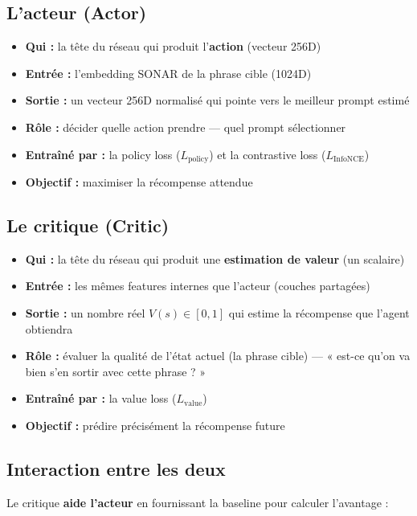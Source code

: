 \documentclass[11pt,a4paper]{article}
\begin{document}
\subsection{L'acteur (Actor)}

\begin{itemize}
    \item \textbf{Qui :} la tête du réseau qui produit l'\textbf{action} (vecteur 256D)
    \item \textbf{Entrée :} l'embedding SONAR de la phrase cible (1024D)
    \item \textbf{Sortie :} un vecteur 256D normalisé qui pointe vers le meilleur prompt estimé
    \item \textbf{Rôle :} décider quelle action prendre — quel prompt sélectionner
    \item \textbf{Entraîné par :} la policy loss ($L_{\text{policy}}$) et la contrastive loss ($L_{\text{InfoNCE}}$)
    \item \textbf{Objectif :} maximiser la récompense attendue
\end{itemize}

\subsection{Le critique (Critic)}

\begin{itemize}
    \item \textbf{Qui :} la tête du réseau qui produit une \textbf{estimation de valeur} (un scalaire)
    \item \textbf{Entrée :} les mêmes features internes que l'acteur (couches partagées)
    \item \textbf{Sortie :} un nombre réel $V(s) \in [0, 1]$ qui estime la récompense que l'agent obtiendra
    \item \textbf{Rôle :} évaluer la qualité de l'état actuel (la phrase cible) — « est-ce qu'on va bien s'en sortir avec cette phrase ? »
    \item \textbf{Entraîné par :} la value loss ($L_{\text{value}}$)
    \item \textbf{Objectif :} prédire précisément la récompense future
\end{itemize}

\subsection{Interaction entre les deux}

Le critique \textbf{aide l'acteur} en fournissant la baseline pour calculer l'avantage :
\end{document}
